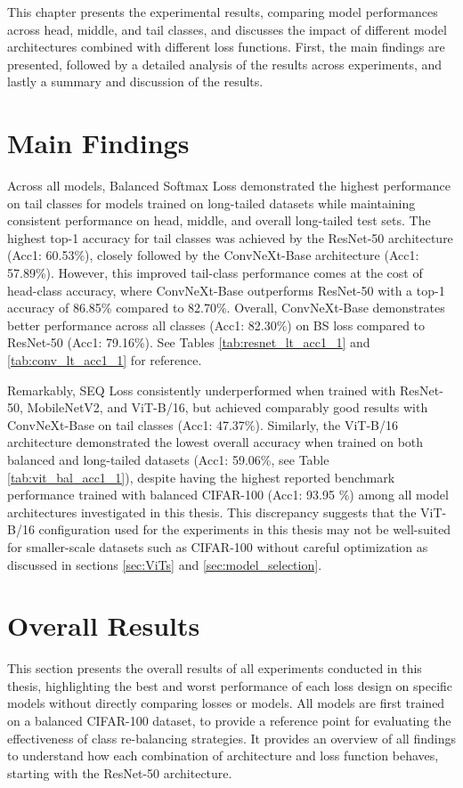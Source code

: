 \label{chap:results}
This chapter presents the experimental results, comparing model performances across head, middle, and tail classes, and discusses the impact of different model architectures combined with different loss functions. First, the main findings are presented, followed by a detailed analysis of the results across experiments, and lastly a summary and discussion of the results. 


\section{Main Findings}
Across all models, Balanced Softmax Loss demonstrated the highest performance on tail classes for models trained on long-tailed datasets while maintaining consistent performance on head, middle, and overall long-tailed test sets. The highest top-1 accuracy for tail classes was achieved by the ResNet-50 architecture (Acc1: 60.53\%), closely followed by the ConvNeXt-Base architecture (Acc1: 57.89\%). However, this improved tail-class performance comes at the cost of head-class accuracy, where ConvNeXt-Base outperforms ResNet-50 with a top-1 accuracy of 86.85\% compared to 82.70\%. Overall, ConvNeXt-Base demonstrates better performance across all classes (Acc1: 82.30\%) on BS loss compared to ResNet-50 (Acc1: 79.16\%). See Tables \ref{tab:resnet_lt_acc1_1} and \ref{tab:conv_lt_acc1_1} for reference. 

Remarkably, SEQ Loss consistently underperformed when trained with ResNet-50, MobileNetV2, and ViT-B/16, but achieved comparably good results with ConvNeXt-Base on tail classes (Acc1: 47.37\%). Similarly, the ViT-B/16 architecture demonstrated the lowest overall accuracy when trained on both balanced and long-tailed datasets (Acc1: 59.06\%, see Table \ref{tab:vit_bal_acc1_1}), despite having the highest reported benchmark performance trained with balanced CIFAR-100 (Acc1: 93.95 \%) among all model architectures investigated in this thesis. This discrepancy suggests that the ViT-B/16 configuration used for the experiments in this thesis may not be well-suited for smaller-scale datasets such as CIFAR-100 without careful optimization as discussed in sections \ref{sec:ViTs} and \ref{sec:model_selection}.

\section{Overall Results}
This section presents the overall results of all experiments conducted in this thesis, highlighting the best and worst performance of each loss design on specific models without directly comparing losses or models. All models are first trained on a balanced CIFAR-100 dataset, to provide a reference point for evaluating the effectiveness of class re-balancing strategies. It provides an overview of all findings to understand how each combination of architecture and loss function behaves, starting with the ResNet-50 architecture.

